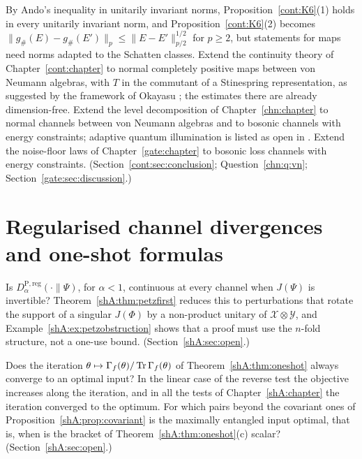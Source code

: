 \begin{problem}\label{op:prob:infinite}
By Ando's inequality in unitarily invariant norms, Proposition~\ref{cont:K6}(1) holds in every unitarily invariant norm, and Proposition~\ref{cont:K6}(2) becomes $\|g_\#(E)-g_\#(E')\|_p\le\|E-E'\|_{p/2}^{1/2}$ for $p\ge2$, but statements for maps need norms adapted to the Schatten classes. Extend the continuity theory of Chapter~\ref{cont:chapter} to normal completely positive maps between von Neumann algebras, with $T$ in the commutant of a Stinespring representation, as suggested by the framework of Okayasu \cite{Okayasu2026,Okayasu2026maxf}; the estimates there are already dimension-free. Extend the level decomposition of Chapter~\ref{chn:chapter} to normal channels between von Neumann algebras and to bosonic channels with energy constraints; adaptive quantum illumination is listed as open in \cite{NairGu2020}. Extend the noise-floor laws of Chapter~\ref{gate:chapter} to bosonic loss channels with energy constraints. (Section~\ref{cont:sec:conclusion}; Question~\ref{chn:q:vn}; Section~\ref{gate:sec:discussion}.)
\end{problem}

\section{Regularised channel divergences and one-shot formulas}\label{op:sec:regularised}

\begin{question}\label{op:q:petz reg}
Is $D^{\mathrm P,\mathrm{reg}}_\alpha(\cdot\|\Psi)$, for $\alpha<1$, continuous at every channel when $J(\Psi)$ is invertible? Theorem~\ref{shA:thm:petzfirst} reduces this to perturbations that rotate the support of a singular $J(\Phi)$ by a non-product unitary of $\mathcal X\otimes\mathcal Y$, and Example~\ref{shA:ex:petzobstruction} shows that a proof must use the $n$-fold structure, not a one-use bound. (Section~\ref{shA:sec:open}.)
\end{question}

\begin{question}\label{op:q:iteration}
Does the iteration $\theta\mapsto\Gamma_f(\theta)/\operatorname{Tr}\Gamma_f(\theta)$ of Theorem~\ref{shA:thm:oneshot} always converge to an optimal input? In the linear case of the reverse test the objective increases along the iteration, and in all the tests of Chapter~\ref{shA:chapter} the iteration converged to the optimum. For which pairs beyond the covariant ones of Proposition~\ref{shA:prop:covariant} is the maximally entangled input optimal, that is, when is the bracket of Theorem~\ref{shA:thm:oneshot}(c) scalar? (Section~\ref{shA:sec:open}.)
\end{question}

